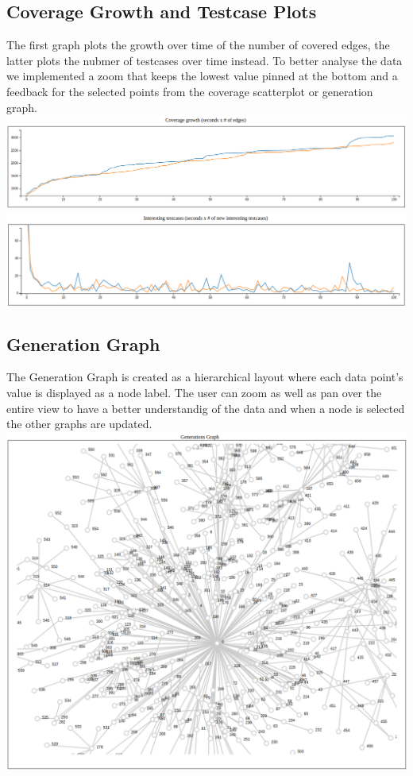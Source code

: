 \documentclass[conference,compsoc]{IEEEtran}
\begin{document}
\subsection{Coverage Growth and Testcase Plots}
The first graph plots the growth over time of the number of covered edges, the latter plots the nubmer of testcases over time instead.
To better analyse the data we implemented a zoom that keeps the lowest value pinned at the bottom and a feedback for the selected points from the coverage scatterplot or generation graph.
\includegraphics[scale=0.3]{img/coverage}
\includegraphics[scale=0.3]{img/inputs}

\subsection{Generation Graph}
The Generation Graph is created as a hierarchical layout where each data point's value is displayed as a node label. The user can zoom as well as pan over the entire view to have a better understandig of the data and when a node is selected the other graphs are updated.
\includegraphics[scale=0.2]{img/tree}
\end{document}
